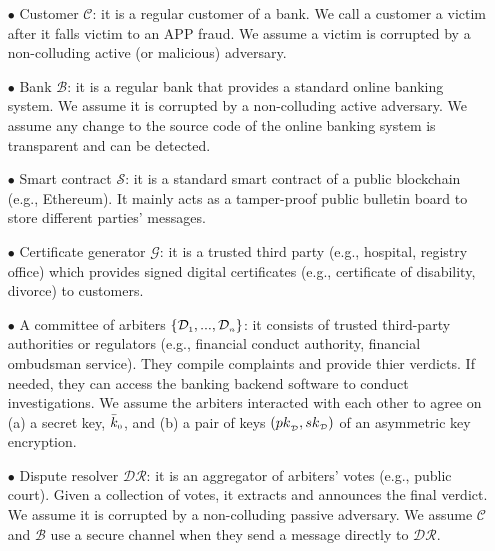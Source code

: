 \begin{itemize}
%
\item[$\bullet$] Customer $\mathcal{C}$: it is a regular customer of a bank. We call a customer  a victim after it falls victim to an APP fraud. We assume a victim is corrupted by a non-colluding active (or malicious) adversary. %
%
\item[$\bullet$] Bank $\mathcal{B}$: it is a regular bank that provides a standard online banking system. We assume it is corrupted by a non-colluding active adversary. We assume  any change to the source code of the online banking system is transparent and  can be detected. 


%
\item[$\bullet$] Smart contract $\mathcal{S}$: it is a standard  smart contract of a public  blockchain (e.g., Ethereum). It mainly acts as a tamper-proof public bulletin board to store different parties' messages.  %
%
\item[$\bullet$] Certificate generator $\mathcal{G}$: it is a trusted third party (e.g., hospital, registry office) which provides signed digital certificates (e.g., certificate of  disability, divorce) to customers. %
%
\item[$\bullet$]  A committee of arbiters $\{\mathcal{D}_{\scriptscriptstyle 1},..., \mathcal{D}_{\scriptscriptstyle n}\}$: it consists of  trusted third-party authorities or regulators (e.g.,  financial conduct authority, financial ombudsman service). They compile  complaints    and provide thier   verdicts. If needed, they can access the banking   backend software to conduct  investigations. We assume the arbiters  interacted with each other   to agree on (a) a secret key, $\bar k_{\scriptscriptstyle 0}$, and (b) a pair of keys $({pk}_{\scriptscriptstyle\mathcal {D}}, {sk}_{\scriptscriptstyle\mathcal {D}})$  of an asymmetric key encryption.
%
\item[$\bullet$]  Dispute resolver $\mathcal{DR}$: it is an aggregator of arbiters' votes (e.g., public court). Given a collection of votes, it extracts and announces the final verdict. We assume it is corrupted by a non-colluding passive adversary. We assume $\mathcal C$ and $\mathcal B$  use a secure channel when they  send a message directly to $\mathcal{DR}$. 
%
\end{itemize}

